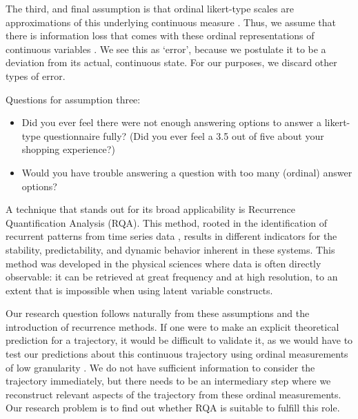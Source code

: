 \documentclass[utf8]{FrontiersinVancouver}
\begin{document}
The third, and final assumption is that ordinal likert-type scales are approximations of this underlying continuous measure \citep{haslbeckRecoveringWithinpersonDynamics2022}. Thus, we assume that there is information loss that comes with these ordinal representations of continuous variables \citep{westlandInformationLossBias2022}. We see this as `error', because we postulate it to be a deviation from its actual, continuous state. For our purposes, we discard other types of error.

\begin{framed}
    Questions for assumption three:
    \begin{itemize}
        \item Did you ever feel there were not enough answering options to answer a likert-type questionnaire fully? (Did you ever feel a 3.5 out of five about your shopping experience?)
        \item Would you have trouble answering a question with too many (ordinal) answer options?
    \end{itemize}
\end{framed}

A technique that stands out for its broad applicability is Recurrence Quantification Analysis (RQA). This method, rooted in the identification of recurrent patterns from time series data \citep{webber2005recurrence}, results in different indicators for the stability, predictability, and dynamic behavior inherent in these systems. This method was developed in the physical sciences where data is often directly observable: it can be retrieved at great frequency and at high resolution, to an extent that is impossible when using latent variable constructs. 

Our research question follows naturally from these assumptions and the introduction of recurrence methods. If one were to make an explicit theoretical prediction for a trajectory, it would be difficult to validate it, as we would have to test our predictions about this continuous trajectory using ordinal measurements of low granularity \citep{haslbeckRecoveringWithinpersonDynamics2022}. We do not have sufficient information to consider the trajectory immediately, but there needs to be an intermediary step where we reconstruct relevant aspects of the trajectory from these ordinal measurements. Our research problem is to find out whether RQA is suitable to fulfill this role.
\end{document}
